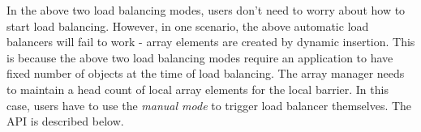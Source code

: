 
In the above two load balancing modes, users don't need 
to worry about how to start load balancing. 
However, in one scenario, the above automatic load balancers will fail to
work - array elements are created by dynamic insertion.
This is because the above two load balancing modes require an application
to have fixed number of objects at the time of load balancing.
The array manager needs to maintain a head count of local array elements
for the local barrier.
In this case, users have to use the {\em manual mode} to trigger 
load balancer themselves. The API is described below.


